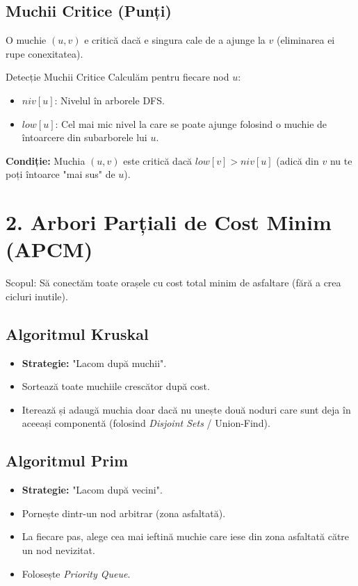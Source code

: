 \documentclass[a4paper,10pt]{article}
\begin{document}
\subsection{Muchii Critice (Punți)}
O muchie $(u, v)$ e critică dacă e singura cale de a ajunge la $v$ (eliminarea ei rupe conexitatea).

\begin{algorithmbox}{Detecție Muchii Critice}
Calculăm pentru fiecare nod $u$:
\begin{itemize}
    \item $niv[u]$: Nivelul în arborele DFS.
    \item $low[u]$: Cel mai mic nivel la care se poate ajunge folosind o muchie de întoarcere din subarborele lui $u$.
\end{itemize}
\textbf{Condiție:} Muchia $(u,v)$ este critică dacă $low[v] > niv[u]$ (adică din $v$ nu te poți întoarce "mai sus" de $u$).
\end{algorithmbox}

\section{2. Arbori Parțiali de Cost Minim (APCM)}

\begin{intuition}
Scopul: Să conectăm toate orașele cu cost total minim de asfaltare (fără a crea cicluri inutile).
\end{intuition}

\subsection{Algoritmul Kruskal}
\begin{itemize}
    \item \textbf{Strategie:} "Lacom după muchii".
    \item Sortează toate muchiile crescător după cost.
    \item Iterează și adaugă muchia doar dacă nu unește două noduri care sunt deja în aceeași componentă (folosind \textit{Disjoint Sets} / Union-Find).
\end{itemize}

\subsection{Algoritmul Prim}
\begin{itemize}
    \item \textbf{Strategie:} "Lacom după vecini".
    \item Pornește dintr-un nod arbitrar (zona asfaltată).
    \item La fiecare pas, alege cea mai ieftină muchie care iese din zona asfaltată către un nod nevizitat.
    \item Folosește \textit{Priority Queue}.
\end{itemize}
\end{document}
